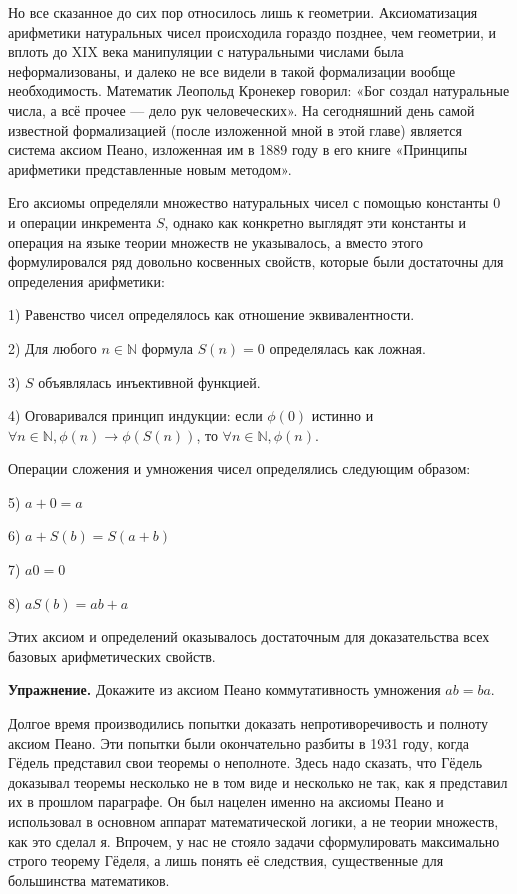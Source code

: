 Но все сказанное до сих пор относилось лишь к геометрии. Аксиоматизация арифметики натуральных чисел происходила гораздо позднее, чем геометрии, и вплоть до XIX века манипуляции с натуральными числами была неформализованы, и далеко не все видели в такой формализации вообще необходимость. Математик Леопольд Кронекер говорил: «Бог создал натуральные числа, а всё прочее — дело рук человеческих». На сегодняшний день самой известной формализацией (после изложенной мной в этой главе) является система аксиом Пеано, изложенная им в 1889 году в его книге «Принципы арифметики представленные новым методом».

Его аксиомы определяли множество натуральных чисел с помощью константы $0$ и операции инкремента $S$, однако как конкретно выглядят эти константы и операция на языке теории множеств не указывалось, а вместо этого формулировался ряд довольно косвенных свойств, которые были достаточны для определения арифметики:

1) Равенство чисел определялось как отношение эквивалентности.

2) Для любого $n\in\mathbb{N}$ формула $S(n) = 0$ определялась как ложная.

3) $S$ объявлялась инъективной функцией.

4) Оговаривался принцип индукции: если $\phi(0)$ истинно и $\forall n\in\mathbb{N}, \phi(n)\rightarrow \phi(S(n))$, то $\forall n\in\mathbb{N}, \phi(n)$.

Операции сложения и умножения чисел определялись следующим образом:

5) $a+0 = a$

6) $a+S(b) = S(a + b)$

7) $a0 = 0$

8) $aS(b) = ab + a$

Этих аксиом и определений оказывалось достаточным для доказательства всех базовых арифметических свойств.

{\bfseries Упражнение.} Докажите из аксиом Пеано коммутативность умножения $ab=ba$.

Долгое время производились попытки доказать непротиворечивость и полноту аксиом Пеано. Эти попытки были окончательно разбиты в 1931 году, когда Гёдель представил свои теоремы о неполноте. Здесь надо сказать, что Гёдель доказывал теоремы несколько не в том виде и несколько не так, как я представил их в прошлом параграфе. Он был нацелен именно на аксиомы Пеано и использовал в основном аппарат математической логики, а не теории множеств, как это сделал я. Впрочем, у нас не стояло задачи сформулировать максимально строго теорему Гёделя, а лишь понять её следствия, существенные для большинства математиков.

